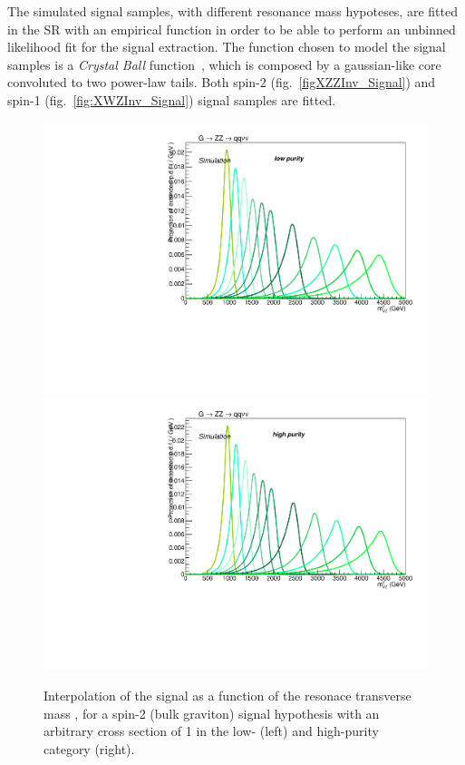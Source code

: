 The simulated signal samples, with different resonance mass hypoteses, are fitted in the SR with an empirical function in order to be able to perform an unbinned likelihood fit for the signal extraction. The function chosen to model the signal samples is a \emph{Crystal Ball} function~\cite{Oreglia:1980cs,Skwarnicki:1986xj}, which is composed by a gaussian-like core convoluted to two power-law tails. %
Both spin-2 (fig.~\ref{figXZZInv_Signal}) and spin-1 (fig.~\ref{fig:XWZInv_Signal}) signal samples are fitted.

\begin{figure}[!htb]
  \centering
    \includegraphics[width=.495\textwidth]{plotsAlpha_tesi/XVZnnlp/XZZInv_Signal.pdf}
    \includegraphics[width=.495\textwidth]{plotsAlpha_tesi/XVZnnhp/XZZInv_Signal.pdf}
  \caption{Interpolation of the signal as a function of the resonace transverse mass \mtVZ, for a spin-2 (bulk graviton) signal hypothesis with an arbitrary cross section of 1 \pb in the low- (left) and high-purity category (right).}
  \label{fig:XZZInv_Signal}
\end{figure}


